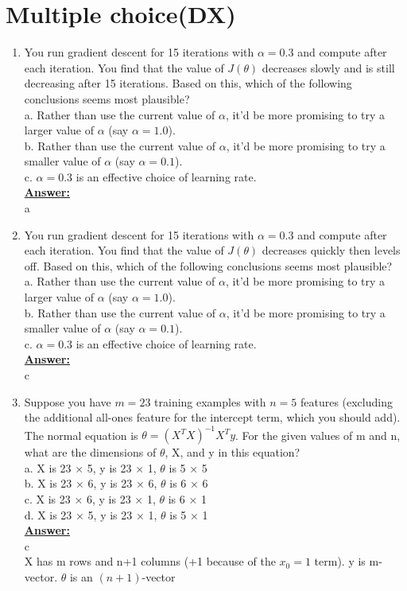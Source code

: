 \documentclass{article}
\newenvironment{qparts}{\begin{enumerate}[1.]}{\end{enumerate}}
\begin{document}
\newpage
\section{Multiple choice(DX)}
\begin{qparts}
\item You run gradient descent for 15 iterations with $\alpha = 0.3$ and compute after each iteration. You find that the value of $J(\theta)$ decreases slowly and is still decreasing after 15 iterations. Based on this, which of the following conclusions seems most plausible?\\
 a. Rather than use the current value of  $\alpha$, it’d be more promising to try a larger value of $\alpha$ (say $\alpha = 1.0$).\\
 b. Rather than use the current value of $\alpha$, it’d be more promising to try a smaller value of $\alpha$ (say $\alpha = 0.1$).\\
 c. $\alpha = 0.3$ is an effective choice of learning rate.\\
\underline{\textbf{Answer:}}\\
a
\item You run gradient descent for 15 iterations with $\alpha = 0.3$ and compute after each iteration. You find that the value of $J(\theta)$ decreases quickly then levels off. Based on this, which of the following conclusions seems most plausible?\\
 a. Rather than use the current value of  $\alpha$, it’d be more promising to try a larger value of $\alpha$ (say $\alpha = 1.0$).\\
 b. Rather than use the current value of $\alpha$, it’d be more promising to try a smaller value of $\alpha$ (say $\alpha = 0.1$).\\
 c. $\alpha = 0.3$ is an effective choice of learning rate.\\
\underline{\textbf{Answer:}}\\
c

\item Suppose you have $m = 23$ training examples with $n = 5$ features (excluding the additional all-ones feature for the intercept term, which you should add). The normal equation is $\theta = (X^{T} X)^{-1}X^{T}y$. For the given values of m and n, what are the dimensions of $\theta$, X, and y in this equation?\\
a. X is 23 × 5, y is 23 × 1, $\theta$ is 5 × 5\\
b. X is 23 × 6, y is 23 × 6, $\theta$ is 6 × 6\\
c. X is 23 × 6, y is 23 × 1, $\theta$ is 6 × 1\\
d. X is 23 × 5, y is 23 × 1, $\theta$ is 5 × 1\\
\underline{\textbf{Answer:}}\\
c\\
 X has m rows and n+1 columns (+1 because of the $x_0=1$ term). y is m-vector. $\theta$ is an $(n+1)$-vector



\end{qparts}
\end{document}
